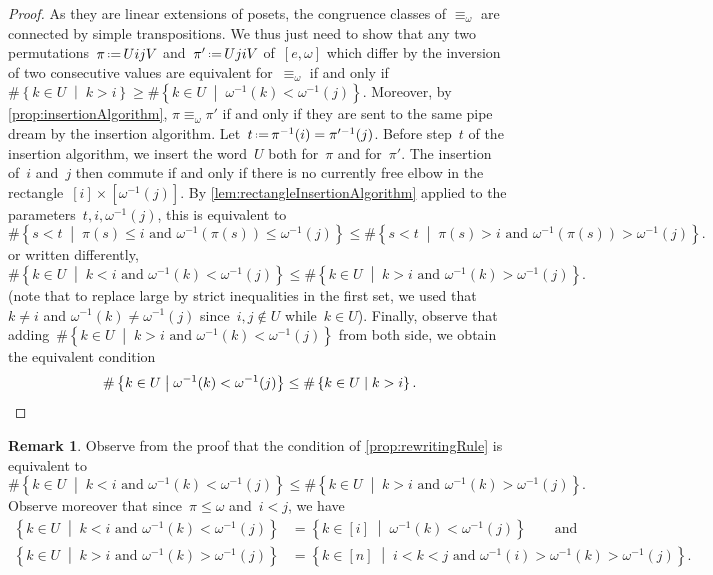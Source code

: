 \documentclass[reqno]{amsart}
\theoremstyle{definition}
\newtheorem{remark}[theorem]{Remark}
\newcommand{\set}[2]{\left\{ #1 \;\middle|\; #2 \right\}} %
\newcommand{\eqdef}{\mbox{\,\raisebox{0.2ex}{\scriptsize\ensuremath{\mathrm:}}\ensuremath{=}\,}} %
\begin{document}
\begin{proof}
As they are linear extensions of posets, the congruence classes of $\equiv_\omega$ are connected by simple transpositions.
We thus just need to show that any two permutations~$\pi \eqdef UijV$ and~$\pi' \eqdef UjiV$ of~$[e, \omega]$ which differ by the inversion of two consecutive values are equivalent for~$\equiv_\omega$ if and only if~$\# \set{k \in U}{k > i} \ge \# \set{k \in U}{\omega^{-1}(k) < \omega^{-1}(j)}$.
Moreover, by \cref{prop:insertionAlgorithm}, $\pi \equiv_\omega \pi'$ if and only if they are sent to the same pipe dream by the insertion algorithm.
Let~$t \eqdef \pi^{-1}(i) = \pi'^{-1}(j)$.
Before step~$t$ of the insertion algorithm, we insert the word~$U$ both for~$\pi$ and for~$\pi'$.
The insertion of~$i$ and~$j$ then commute if and only if there is no currently free elbow in the rectangle~$[i] \times [\omega^{-1}(j)]$.
By \cref{lem:rectangleInsertionAlgorithm} applied to the parameters~$t, i, \omega^{-1}(j)$, this is equivalent to
\[
\# \set{s < t}{\pi(s) \le i \text{ and } \omega^{-1}(\pi(s)) \le \omega^{-1}(j)} \le \# \set{s < t}{\pi(s) > i \text{ and } \omega^{-1}(\pi(s)) > \omega^{-1}(j)}.
\]
or written differently,
\[
\# \set{k \in U}{k < i \text{ and } \omega^{-1}(k) < \omega^{-1}(j)} \le \# \set{k \in U}{k > i \text{ and } \omega^{-1}(k) > \omega^{-1}(j)}.
\]
(note that  to replace large by strict inequalities in the first set, we used that~$k \ne i$ and ${\omega^{-1}(k) \ne \omega^{-1}(j)}$ since~$i,j \notin U$ while~$k \in U$).
Finally, observe that adding~$\# \set{k \in U}{k > i \text{ and } \omega^{-1}(k) < \omega^{-1}(j)}$ from both side, we obtain the equivalent condition
\[
\# \set{k \in U}{\omega^{-1}(k) < \omega^{-1}(j)} \le \# \set{k \in U}{k > i}.
\qedhere
\]
\end{proof}

\begin{remark}
\label{rem:rewritingRule}
Observe from the proof that the condition of \cref{prop:rewritingRule} is equivalent to
\[
\# \set{k \in U}{k < i \text{ and } \omega^{-1}(k) < \omega^{-1}(j)} \le \# \set{k \in U}{k > i \text{ and } \omega^{-1}(k) > \omega^{-1}(j)}.
\]
Observe moreover that since~$\pi \le \omega$ and~$i < j$, we have
\begin{align*}
\set{k \in U}{k < i \text{ and } \omega^{-1}(k) < \omega^{-1}(j)} & = \set{k \in [i]}{\omega^{-1}(k) < \omega^{-1}(j)} \qquad \text{and}\\
\set{k \in U}{k > i \text{ and } \omega^{-1}(k) > \omega^{-1}(j)} & = \set{k \in [n]}{i < k < j \text{ and } \omega^{-1}(i) > \omega^{-1}(k) > \omega^{-1}(j)}.
\end{align*}
\end{remark}
\end{document}
